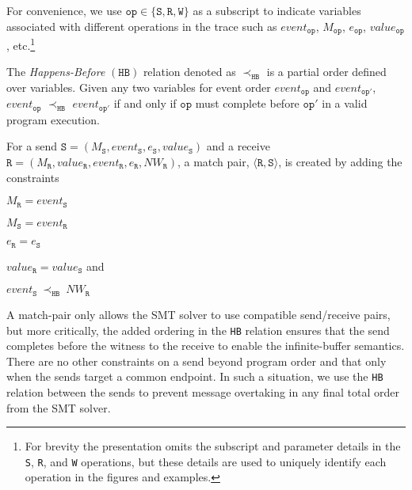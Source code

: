 For convenience, we use $\mathtt{op} \in \{\mathtt{S}, \mathtt{R},
\mathtt{W}\}$ as a subscript to indicate variables associated with different
operations in the trace such as $\mathit{event}_\mathtt{op}$, $M_{\mathtt{op}}$, $e_{\mathtt{op}}$, $value_{\mathtt{op}}$, etc.\footnote{For brevity the presentation omits the subscript and parameter details in the \texttt{S}, \texttt{R}, and \texttt{W} operations, but these details are used to uniquely identify each operation in the figures and examples.}
\begin{definition}
The \emph{Happens-Before} $(\mathtt{HB})$ relation denoted as $\mathrm{\prec_\mathtt{HB}}$ is a partial order defined over variables. Given any two variables for event order $event_{\mathtt{op}}$ and $event_{\mathtt{op'}}$, $event_{\mathtt{op}}$ $\mathrm{\prec_{\mathtt{HB}}}$ $event_{\mathtt{op'}}$ if and only if $\mathtt{op}$ must complete before $\mathtt{op'}$ in a valid program execution.
\label{def:hb}
\end{definition}
\begin{definition}
For a send $\mathtt{S}=(M_\mathtt{S},\mathit{event}_\mathtt{S}, e_\mathtt{S},\mathit{value}_\mathtt{S})$ and a receive $\mathtt{R}=(M_\mathtt{R},\mathit{value}_\mathtt{R}, \mathit{event}_\mathtt{R}, e_\mathtt{R},\mathit{NW}_\mathtt{R})$, a match pair, $\langle\mathtt{R}, \mathtt{S}\rangle$, is created by adding the constraints
\begin{compactenum}
\item $M_{\mathtt{R}} = event_{\mathtt{S}}$
\item $M_{\mathtt{S}} = event_{\mathtt{R}}$
\item $e_{\mathtt{R}} = e_{\mathtt{S}}$
\item $value_{\mathtt{R}} = value_{\mathtt{S}}$ and
\item $event_{\mathtt{S}}\ \mathrm{\prec_\mathtt{HB}}\ \mathit{NW}_{\mathtt{R}}$
\end{compactenum}
\label{def:match}
\end{definition}
A match-pair only allows the SMT solver to use compatible send/receive
pairs, but more critically, the added ordering in the \texttt{HB}
relation ensures that the send completes before the witness to the
receive to enable the infinite-buffer semantics. There are no other
constraints on a send beyond program order and that only when the
sends target a common endpoint. In such a situation, we use the
\texttt{HB} relation between the sends to prevent message overtaking in
any final total order from the SMT solver.

